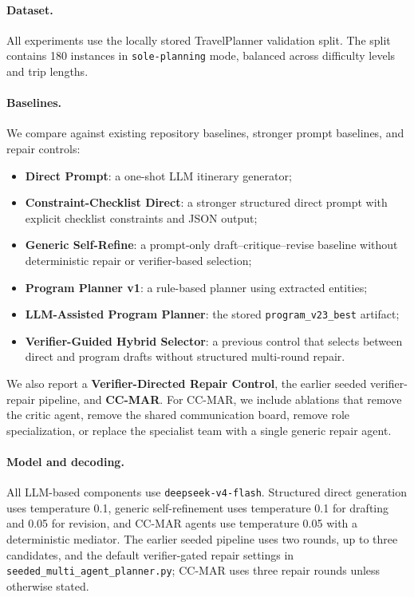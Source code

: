 \documentclass{article}
\begin{document}
\paragraph{Dataset.}
All experiments use the locally stored TravelPlanner validation split. The split contains 180 instances in \texttt{sole-planning} mode, balanced across difficulty levels and trip lengths.

\paragraph{Baselines.}
We compare against existing repository baselines, stronger prompt baselines, and repair controls:
\begin{itemize}[leftmargin=1.5em]
    \item \textbf{Direct Prompt}: a one-shot LLM itinerary generator;
    \item \textbf{Constraint-Checklist Direct}: a stronger structured direct prompt with explicit checklist constraints and JSON output;
    \item \textbf{Generic Self-Refine}: a prompt-only draft--critique--revise baseline without deterministic repair or verifier-based selection;
    \item \textbf{Program Planner v1}: a rule-based planner using extracted entities;
    \item \textbf{LLM-Assisted Program Planner}: the stored \texttt{program\_v23\_best} artifact;
    \item \textbf{Verifier-Guided Hybrid Selector}: a previous control that selects between direct and program drafts without structured multi-round repair.
\end{itemize}
We also report a \textbf{Verifier-Directed Repair Control}, the earlier seeded verifier-repair pipeline, and \textbf{CC-MAR}. For CC-MAR, we include ablations that remove the critic agent, remove the shared communication board, remove role specialization, or replace the specialist team with a single generic repair agent.

\paragraph{Model and decoding.}
All LLM-based components use \texttt{deepseek-v4-flash}. Structured direct generation uses temperature 0.1, generic self-refinement uses temperature 0.1 for drafting and 0.05 for revision, and CC-MAR agents use temperature 0.05 with a deterministic mediator. The earlier seeded pipeline uses two rounds, up to three candidates, and the default verifier-gated repair settings in \texttt{seeded\_multi\_agent\_planner.py}; CC-MAR uses three repair rounds unless otherwise stated.
\end{document}

